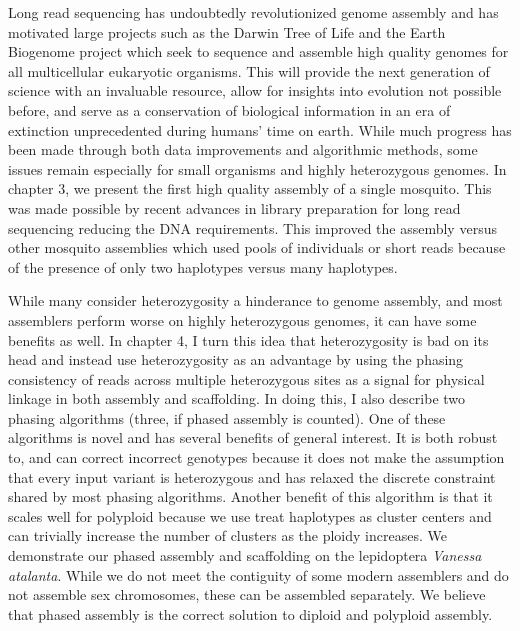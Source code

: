 \par{
Long read sequencing has undoubtedly revolutionized genome assembly and has motivated large projects such as the Darwin Tree of Life and the Earth Biogenome project which seek to sequence and assemble high quality genomes for all multicellular eukaryotic organisms. This will provide the next generation of science with an invaluable resource, allow for insights into evolution not possible before, and serve as a conservation of biological information in an era of extinction unprecedented during humans' time on earth. While much progress has been made through both data improvements and algorithmic methods, some issues remain especially for small organisms and highly heterozygous genomes. In chapter 3, we present the first high quality assembly of a single mosquito. This was made possible by recent advances in library preparation for long read sequencing reducing the DNA requirements. This improved the assembly versus other mosquito assemblies which used pools of individuals or short reads because of the presence of only two haplotypes versus many haplotypes.
}

\par{
While many consider heterozygosity a hinderance to genome assembly, and most assemblers perform worse on highly heterozygous genomes, it can have some benefits as well. In chapter 4, I turn this idea that heterozygosity is bad on its head and instead use heterozygosity as an advantage by using the phasing consistency of reads across multiple heterozygous sites as a signal for physical linkage in both assembly and scaffolding. In doing this, I also describe two phasing algorithms (three, if phased assembly is counted). One of these algorithms is novel and has several benefits of general interest. It is both robust to, and can correct incorrect genotypes because it does not make the assumption that every input variant is heterozygous and has relaxed the discrete constraint shared by most phasing algorithms. Another benefit of this algorithm is that it scales well for polyploid because we use treat haplotypes as cluster centers and can trivially increase the number of clusters as the ploidy increases. We demonstrate our phased assembly and scaffolding on the lepidoptera \textit{Vanessa atalanta}. While we do not meet the contiguity of some modern assemblers and do not assemble sex chromosomes, these can be assembled separately. We believe that phased assembly is the correct solution to diploid and polyploid assembly.
}
